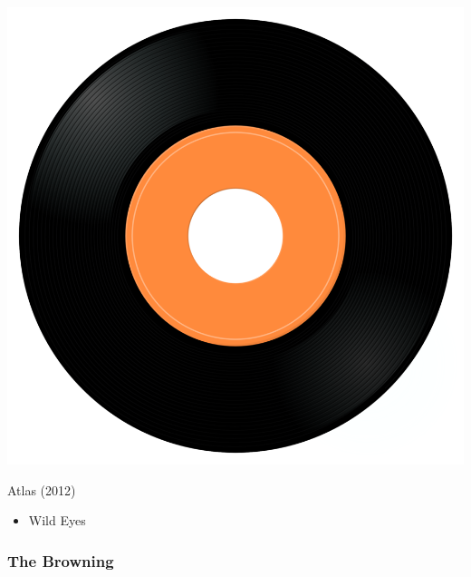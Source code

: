 \begin{minipage}[t]{0.25\textwidth}\vspace{0pt}
\captionsetup{type=figure}
\includegraphics[width=\textwidth]{Images/cover.png}
\caption*{Atlas (2012)}
\end{minipage}
\begin{minipage}[t]{0.25\textwidth}\vspace{0pt}
\begin{itemize}[nosep,leftmargin=1em,labelwidth=*,align=left]
	\setlength{\itemsep}{0pt}
	\item Wild Eyes
\end{itemize}
\end{minipage}


\subsubsection{The Browning}

